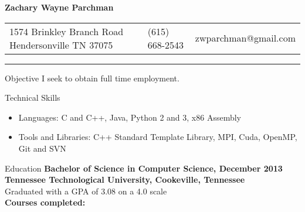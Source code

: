 \documentclass[10pt]{res}
\begin{document}
 



\fontsize{10}{11}\selectfont

\begin{resume}

\vspace{-15mm}
\begin{center}
\begin{Huge}
    \bf{Zachary Wayne Parchman}
\end{Huge}
\end{center}


\begin{large}
\begin{tabularx}{\textwidth}{p{2.25in} X X}
    1574 Brinkley Branch Road \newline Hendersonville TN 37075
    & (615) 668-2543 & zwparchman@gmail.com\\
\end{tabularx}
\end{large}

\vspace{-0.30in}
\rule{\textwidth}{0.4pt}

\begin{section}{Objective}
    I seek to obtain full time employment.
\end{section}

\begin{section}{Technical Skills}
\begin{itemize}[leftmargin=*] \itemsep -2pt  %
    \item {Languages: C and C++, Java, Python 2 and 3, x86 Assembly}
    \item {Tools and Libraries: C++ Standard Template Library, MPI, Cuda, OpenMP, Git and SVN}
\end{itemize}
\end{section}

\begin{section}{Education}
    {\bf Bachelor of Science in Computer Science, December 2013\\
    Tennessee Technological University, Cookeville, Tennessee}\\
    Graduated with a GPA of 3.08 on a 4.0 scale\\
    {\bf Courses completed:}


\end{section}
\end{resume}
\end{document}
